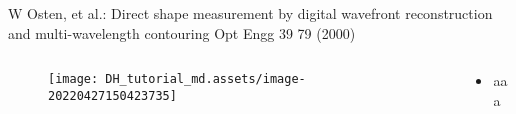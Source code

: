 \documentclass[t, aspectratio=169]{beamer}
\begin{document}
\begin{frame}{W Osten, et al.: Direct shape measurement by digital wavefront reconstruction and multi-wavelength contouring}
	\vspace{-3 mm}
	\small Opt Engg 39 79 (2000)
	\begin{columns}
		\begin{column}{.6\textwidth}
			\begin{figure}
				\texttt{[image: DH\_tutorial\_md.assets/image-20220427150423735]}
			\end{figure}
		\end{column}
		\begin{column}{.4\textwidth}
			\begin{itemize}
				\item aaa
			\end{itemize}
		\end{column}
	\end{columns}
\end{frame}




\end{document}
